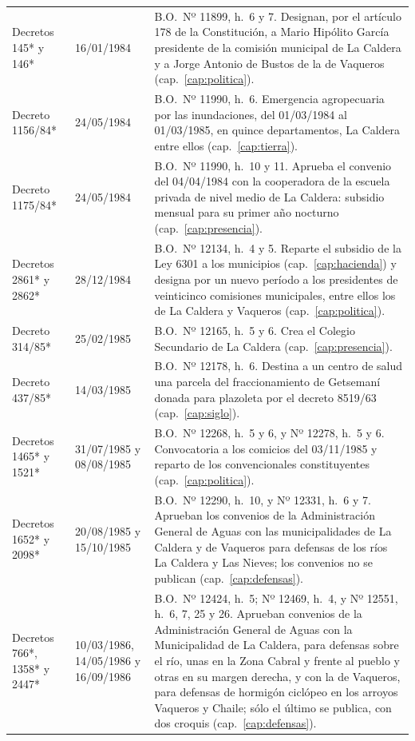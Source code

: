 \begin{longtable}{@{}p{3.2cm}p{1.9cm}p{7.9cm}@{}}
Decretos 145* y 146* & 16/01/1984 & B.O.\ Nº 11899, h.\ 6 y 7. Designan, por el artículo 178 de la Constitución, a Mario Hipólito García presidente de la comisión municipal de La Caldera y a Jorge Antonio de Bustos de la de Vaqueros (cap.\ \ref{cap:politica}). \\
Decreto 1156/84* & 24/05/1984 & B.O.\ Nº 11990, h.\ 6. Emergencia agropecuaria por las inundaciones, del 01/03/1984 al 01/03/1985, en quince departamentos, La Caldera entre ellos (cap.\ \ref{cap:tierra}). \\
Decreto 1175/84* & 24/05/1984 & B.O.\ Nº 11990, h.\ 10 y 11. Aprueba el convenio del 04/04/1984 con la cooperadora de la escuela privada de nivel medio de La Caldera: subsidio mensual para su primer año nocturno (cap.\ \ref{cap:presencia}). \\
Decretos 2861* y 2862* & 28/12/1984 & B.O.\ Nº 12134, h.\ 4 y 5. Reparte el subsidio de la Ley 6301 a los municipios (cap.\ \ref{cap:hacienda}) y designa por un nuevo período a los presidentes de veinticinco comisiones municipales, entre ellos los de La Caldera y Vaqueros (cap.\ \ref{cap:politica}). \\
Decreto 314/85* & 25/02/1985 & B.O.\ Nº 12165, h.\ 5 y 6. Crea el Colegio Secundario de La Caldera (cap.\ \ref{cap:presencia}). \\
Decreto 437/85* & 14/03/1985 & B.O.\ Nº 12178, h.\ 6. Destina a un centro de salud una parcela del fraccionamiento de Getsemaní donada para plazoleta por el decreto 8519/63 (cap.\ \ref{cap:siglo}). \\
Decretos 1465* y 1521* & 31/07/1985 y 08/08/1985 & B.O.\ Nº 12268, h.\ 5 y 6, y Nº 12278, h.\ 5 y 6. Convocatoria a los comicios del 03/11/1985 y reparto de los convencionales constituyentes (cap.\ \ref{cap:politica}). \\
Decretos 1652* y 2098* & 20/08/1985 y 15/10/1985 & B.O.\ Nº 12290, h.\ 10, y Nº 12331, h.\ 6 y 7. Aprueban los convenios de la Administración General de Aguas con las municipalidades de La Caldera y de Vaqueros para defensas de los ríos La Caldera y Las Nieves; los convenios no se publican (cap.\ \ref{cap:defensas}). \\
Decretos 766*, 1358* y 2447* & 10/03/1986, 14/05/1986 y 16/09/1986 & B.O.\ Nº 12424, h.\ 5; Nº 12469, h.\ 4, y Nº 12551, h.\ 6, 7, 25 y 26. Aprueban convenios de la Administración General de Aguas con la Municipalidad de La Caldera, para defensas sobre el río, unas en la Zona Cabral y frente al pueblo y otras en su margen derecha, y con la de Vaqueros, para defensas de hormigón ciclópeo en los arroyos Vaqueros y Chaile; sólo el último se publica, con dos croquis (cap.\ \ref{cap:defensas}). \\

\end{longtable}
